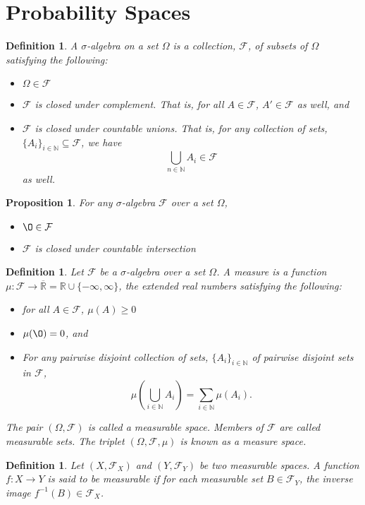 \documentclass[1pt]{report}
\newtheorem{prop}[thm]{Proposition}
\newtheorem{defn}[thm]{Definition}
\newcommand{\Rone}{\mathbb{R}}
\newcommand{\R}{\Rone}
\newcommand{\N}{\mathbb{N}}
\newcommand{\<}{\langle}
\renewcommand{\>}{\rangle}
\renewcommand{\bar}{\overline}
\newcommand{\FF}{\mathcal{F}}
\begin{document}
\section{Probability Spaces}
\begin{defn}\label{def:sigmaalgebra}
A $\sigma$\emph{-algebra} on a set $\Omega$ is a collection, $\FF$, of subsets of $\Omega$ satisfying the following:
\begin{itemize}
\item $\Omega \in \FF$
\item $\FF$ is closed under complement. That is, for all $A \in \FF$, $A' \in \FF$ as well, and
\item $\FF$ is closed under countable unions. That is, for any collection of sets, $\{A_i\}_{i \in \N} \subseteq \FF$, we have
$$\bigcup\limits_{n \in \N}  A_i  \in \FF$$
as well.
\end{itemize}
\end{defn}
\begin{prop}
For any $\sigma$-algebra $\FF$ over a set $\Omega$,
\begin{itemize}
\item $\O \in \FF$
\item $\FF$ is closed under countable intersection
\end{itemize}
\end{prop}
\begin{defn} \label{def:measure}
Let $\FF$ be a $\sigma$-algebra over a set $\Omega$. A \emph{measure} is a function $\mu: \FF \to \bar{\R} = \R \cup \{-\infty, \infty\}$, the extended real numbers satisfying the following:
\begin{itemize}
\item for all $A \in \FF$, $\mu(A) \geq 0$
\item $\mu(\O) = 0$, and 
\item For any pairwise disjoint collection of sets, $\{A_i\}_{i \in \N}$ of pairwise disjoint sets in $\FF$,
$$\mu \left(\bigcup\limits_{i \in \N} A_i \right) = \sum\limits_{i \in \N} \mu(A_i).$$
\end{itemize}
The pair $(\Omega, \FF)$ is called a \emph{measurable space}. Members of $\FF$ are called \emph{measurable sets}. The triplet $(\Omega, \FF, \mu)$ is known as a \emph{measure space}.
\end{defn}
\begin{defn}\label{def:measurablefunction}
Let $(X, \FF_X)$ and $(Y, \FF_Y)$ be two measurable spaces. A function $f: X \to Y$ is said to be \emph{measurable} if for each measurable set $B \in \FF_Y$, the inverse image $f^{-1}(B) \in \FF_X$.
\end{defn}
\end{document}
